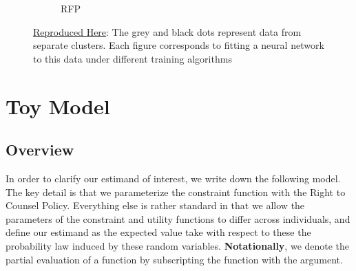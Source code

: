 \documentclass[a4paper,12pt]{article}
\begin{document}
\begin{figure}[htbp]
\begin{subfigure}{.32\textwidth}
        \caption{RFP}
    \label{fig:rfp}
\end{subfigure}
\caption{ \href{https://github.com/pharringtonp19/rfp/blob/main/notebooks/grad_desc_toy.ipynb}{Reproduced Here}: The grey and black dots represent data from separate clusters. Each figure corresponds to fitting a neural network to this data under different training algorithms}
\label{fig:mamlablation}
\end{figure}
\section{Toy Model}
\subsection{Overview}
In order to clarify our estimand of interest, we write down the following model. The key detail is that we parameterize the constraint function with the Right to Counsel Policy. Everything else is rather standard in that we allow the parameters of the constraint and utility functions to differ across individuals, and define our estimand as the expected value take with respect to these the probability law induced by these random variables. \textbf{Notationally}, we denote the partial evaluation of a function by subscripting the function with the argument.\par 
\end{document}
